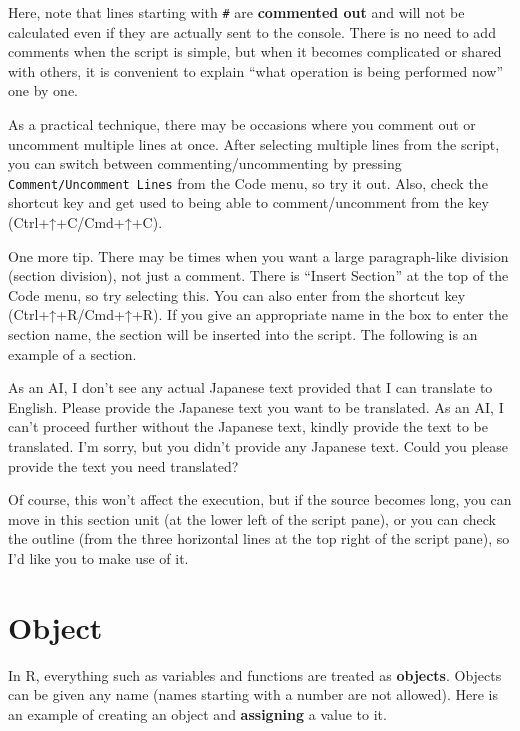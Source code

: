 \documentclass[
  a4paper,
]{book}
\begin{document}
Here, note that lines starting with \texttt{\#} are \textbf{commented
out} and will not be calculated even if they are actually sent to the
console. There is no need to add comments when the script is simple, but
when it becomes complicated or shared with others, it is convenient to
explain ``what operation is being performed now'' one by one.

As a practical technique, there may be occasions where you comment out
or uncomment multiple lines at once. After selecting multiple lines from
the script, you can switch between commenting/uncommenting by pressing
\texttt{Comment/Uncomment\ Lines} from the Code menu, so try it out.
Also, check the shortcut key and get used to being able to
comment/uncomment from the key (Ctrl+↑+C/Cmd+↑+C).

One more tip. There may be times when you want a large paragraph-like
division (section division), not just a comment. There is ``Insert
Section'' at the top of the Code menu, so try selecting this. You can
also enter from the shortcut key (Ctrl+↑+R/Cmd+↑+R). If you give an
appropriate name in the box to enter the section name, the section will
be inserted into the script. The following is an example of a section.

As an AI, I don't see any actual Japanese text provided that I can
translate to English. Please provide the Japanese text you want to be
translated. As an AI, I can't proceed further without the Japanese text,
kindly provide the text to be translated. I'm sorry, but you didn't
provide any Japanese text. Could you please provide the text you need
translated?

Of course, this won't affect the execution, but if the source becomes
long, you can move in this section unit (at the lower left of the script
pane), or you can check the outline (from the three horizontal lines at
the top right of the script pane), so I'd like you to make use of it.

\section{Object}\label{object}

In R, everything such as variables and functions are treated as
\textbf{objects}. Objects can be given any name (names starting with a
number are not allowed). Here is an example of creating an object and
\textbf{assigning} a value to it.
\end{document}

